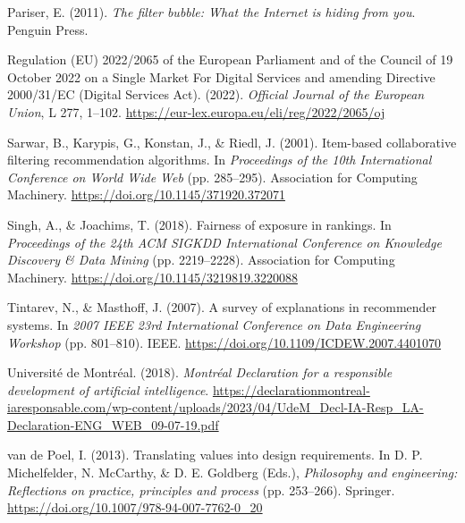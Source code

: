 \documentclass[11pt,letterpaper]{article}
\newenvironment{references}
  {\par\small\raggedright\setlength{\parskip}{3pt plus 1pt}\setlength{\parindent}{0pt}}
  {\par}
\newcommand{\refentry}{\par\noindent\hangindent=0.3in\hangafter=1\relax}
\begin{document}
\begin{references}
\refentry Pariser, E. (2011). \textit{The filter bubble: What the Internet is hiding from you}. Penguin Press.

\refentry Regulation (EU) 2022/2065 of the European Parliament and of the Council of 19 October 2022 on a
Single Market For Digital Services and amending Directive 2000/31/EC (Digital Services Act). (2022).
\textit{Official Journal of the European Union}, L 277, 1--102.
\url{https://eur-lex.europa.eu/eli/reg/2022/2065/oj}

\refentry Sarwar, B., Karypis, G., Konstan, J., \& Riedl, J. (2001). Item-based collaborative filtering
recommendation algorithms. In \textit{Proceedings of the 10th International Conference on World Wide Web} (pp.
285--295). Association for Computing Machinery. \url{https://doi.org/10.1145/371920.372071}

\refentry Singh, A., \& Joachims, T. (2018). Fairness of exposure in rankings. In \textit{Proceedings of the
24th ACM SIGKDD International Conference on Knowledge Discovery \& Data Mining} (pp. 2219--2228). Association
for Computing Machinery. \url{https://doi.org/10.1145/3219819.3220088}

\refentry Tintarev, N., \& Masthoff, J. (2007). A survey of explanations in recommender systems. In
\textit{2007 IEEE 23rd International Conference on Data Engineering Workshop} (pp. 801--810). IEEE.
\url{https://doi.org/10.1109/ICDEW.2007.4401070}

\refentry Université de Montréal. (2018). \textit{Montréal Declaration for a responsible development of
artificial intelligence}.
\url{https://declarationmontreal-iaresponsable.com/wp-content/uploads/2023/04/UdeM_Decl-IA-Resp_LA-Declaration-ENG_WEB_09-07-19.pdf}

\refentry van de Poel, I. (2013). Translating values into design requirements. In D. P. Michelfelder, N.
McCarthy, \& D. E. Goldberg (Eds.), \textit{Philosophy and engineering: Reflections on practice, principles
and process} (pp. 253--266). Springer. \url{https://doi.org/10.1007/978-94-007-7762-0_20}

\end{references}
\end{document}
